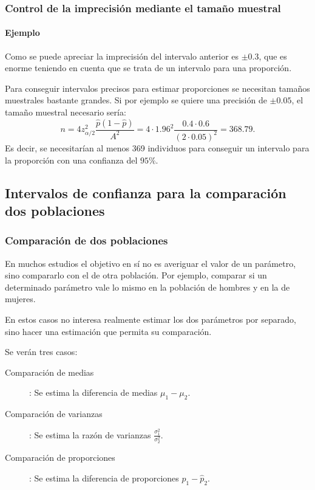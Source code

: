 \begin{frame}
\frametitle{Control de la imprecisión mediante el tamaño muestral}
\framesubtitle{Ejemplo}
Como se puede apreciar la imprecisión del intervalo anterior es $\pm 0.3$, que es enorme teniendo en cuenta que se trata de un intervalo para una proporción.

Para conseguir intervalos precisos para estimar proporciones se necesitan tamaños muestrales bastante grandes.
Si por ejemplo se quiere una precisión de $\pm 0.05$, el tamaño muestral necesario sería:
\[
n= 4 z_{\alpha/2}^2\frac{\hat{p}(1-\hat{p})}{A^2}=4\cdot 1.96^2\frac{0.4\cdot 0.6}{(2\cdot0.05)^2}= 368.79.
\]
Es decir, se necesitarían al menos 369 individuos para conseguir un intervalo para la proporción con una confianza del $95\%$.
\end{frame}


\subsection{Intervalos de confianza para la comparación dos poblaciones}
\begin{frame}
\frametitle{Comparación de dos poblaciones}
En muchos estudios el objetivo en sí no es averiguar el valor de un parámetro, sino compararlo con el de otra población.
Por ejemplo, comparar si un determinado parámetro vale lo mismo en la población de hombres y en la de mujeres.

En estos casos no interesa realmente estimar los dos parámetros por separado, sino hacer una estimación que permita su comparación.

Se verán tres casos:
\begin{description}
\item[Comparación de medias]: Se estima la diferencia de medias $\mu_1-\mu_2$.
\item[Comparación de varianzas]: Se estima la razón de varianzas $\displaystyle \frac{\sigma^2_1}{\sigma^2_2}$.
\item[Comparación de proporciones]: Se estima la diferencia de proporciones $\hat p_1-\hat p_2$.
\end{description}
\end{frame}


